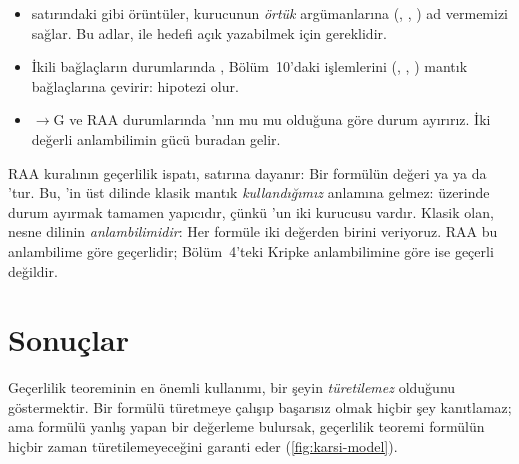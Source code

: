 \begin{itemize}
  \item {} satırındaki 
        gibi örüntüler, kurucunun \emph{örtük} argümanlarına (,
        , ) ad vermemizi sağlar. Bu adlar, 
        ile hedefi açık yazabilmek için gereklidir.
  \item İkili bağlaçların durumlarında , Bölüm~10'daki
         işlemlerini (\lc{\&\&}, \lc{||}, \lc{!}) mantık
        bağlaçlarına çevirir:  hipotezi
         olur.
  \item $\to$G ve RAA durumlarında 'nın  mu
         mu olduğuna göre durum ayırırız. İki değerli
        anlambilimin gücü buradan gelir.
\end{itemize}

\begin{dikkat}
RAA kuralının geçerlilik ispatı,  satırına
dayanır: Bir formülün değeri ya  ya da 'tur. Bu,
\Lean{}'in üst dilinde klasik mantık \emph{kullandığımız} anlamına
gelmez:  üzerinde durum ayırmak tamamen yapıcıdır, çünkü
'un iki kurucusu vardır. Klasik olan, nesne dilinin \emph{anlambilimidir}: Her formüle
iki değerden birini veriyoruz. RAA bu anlambilime göre geçerlidir;
Bölüm~4'teki Kripke anlambilimine göre ise geçerli değildir.
\end{dikkat}

\section{Sonuçlar}\label{sec:gecerlilik-sonuclar}

Geçerlilik teoreminin en önemli kullanımı, bir şeyin \emph{türetilemez}
olduğunu göstermektir. Bir formülü türetmeye çalışıp başarısız olmak hiçbir
şey kanıtlamaz; ama formülü yanlış yapan bir değerleme bulursak, geçerlilik
teoremi formülün hiçbir zaman türetilemeyeceğini garanti eder
(\cref{fig:karsi-model}).


